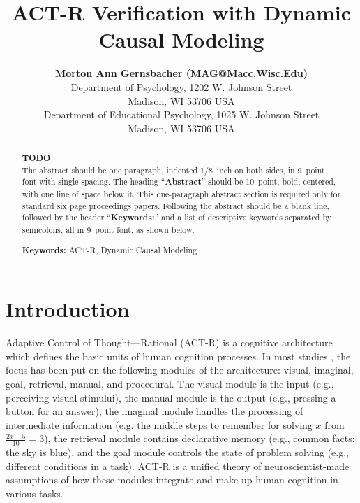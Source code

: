 \documentclass[10pt,letterpaper]{article}
\title{ACT-R Verification with Dynamic Causal Modeling}
\author{{\large \bf Morton Ann Gernsbacher (MAG@Macc.Wisc.Edu)} \\
  Department of Psychology, 1202 W. Johnson Street \\
  Madison, WI 53706 USA
  \AND {\large \bf Sharon J.~Derry (SDJ@Macc.Wisc.Edu)} \\
  Department of Educational Psychology, 1025 W. Johnson Street \\
  Madison, WI 53706 USA}
\begin{document}
\maketitle


\begin{abstract}
\textbf{TODO} \\
The abstract should be one paragraph, indented 1/8~inch on both sides,
in 9~point font with single spacing. The heading ``{\bf Abstract}''
should be 10~point, bold, centered, with one line of space below
it. This one-paragraph abstract section is required only for standard
six page proceedings papers. Following the abstract should be a blank
line, followed by the header ``{\bf Keywords:}'' and a list of
descriptive keywords separated by semicolons, all in 9~point font, as
shown below.

\textbf{Keywords:} 
ACT-R, Dynamic Causal Modeling
\end{abstract}


\section{Introduction}
Adaptive Control of Thought—Rational (ACT-R) \cite{Anderson2004} is a cognitive architecture which defines the basic units of human cognition processes. In most studies \cite{Anderson2004, Anderson2008, Stocco2018, Borst2017}, the focus has been put on the following modules of the architecture: visual, imaginal, goal, retrieval, manual, and procedural. The visual module is the input (e.g., perceiving visual stimului), the manual module is the output (e.g., pressing a button for an answer), the imaginal module handles the processing of intermediate information (e.g. the middle steps to remember for solving $x$ from $\frac{2x - 5}{10} = 3$), the retrieval module contains declarative memory (e.g., common facts: the sky is blue), and the goal module controls the state of problem solving (e.g., different conditions in a task). ACT-R is a unified theory of neuroscientist-made assumptions of how these modules integrate and make up human cognition in various tasks. 
\end{document}
